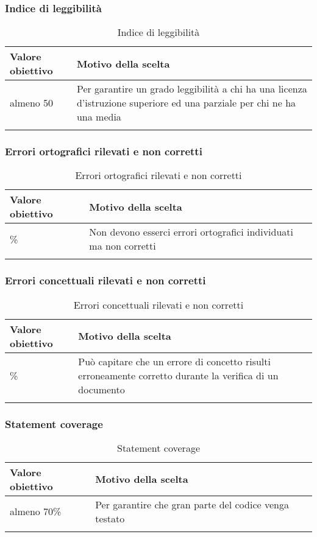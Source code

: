 \documentclass[../PianoDiQualifica_v4.0.0.tex]{subfiles}
\begin{document}
		\subsubsection{Indice di leggibilità}
			\begin{longtable}[c] { >{\centering\arraybackslash}p{4cm} p{7cm} }
				\toprule
				\centerline{\textbf{Valore obiettivo}} & \centerline{\textbf{Motivo della scelta}} \\
				\midrule
					almeno 50 &	Per garantire un grado leggibilità a chi ha una licenza d'istruzione superiore ed una parziale per chi ne ha una media \\
				\bottomrule
				\caption{Indice di leggibilità}
			\end{longtable}

		\subsubsection{Errori ortografici rilevati e non corretti}
			\begin{longtable}[c] { >{\centering\arraybackslash}p{4cm} p{7cm} }
				\toprule
				\centerline{\textbf{Valore obiettivo}} & \centerline{\textbf{Motivo della scelta}} \\
				\midrule
					0\% & Non devono esserci errori ortografici individuati ma non corretti \\
				\bottomrule
				\caption{Errori ortografici rilevati e non corretti}
			\end{longtable}

		\subsubsection{Errori concettuali rilevati e non corretti}
			\begin{longtable}[c] { >{\centering\arraybackslash}p{4cm} p{7cm} }
				\toprule
				\centerline{\textbf{Valore obiettivo}} & \centerline{\textbf{Motivo della scelta}} \\
				\midrule
					5\% & Può capitare che un errore di concetto risulti erroneamente corretto durante la verifica di un documento \\
				\bottomrule
				\caption{Errori concettuali rilevati e non corretti}
			\end{longtable}

		\subsubsection{Statement coverage}
			\begin{longtable}[c] { >{\centering\arraybackslash}p{4cm} p{7cm} }
				\toprule
				\centerline{\textbf{Valore obiettivo}} & \centerline{\textbf{Motivo della scelta}} \\
				\midrule
					almeno 70\% & Per garantire che gran parte del codice venga testato \\
				\bottomrule
				\caption{Statement coverage}
			\end{longtable}
\end{document}

